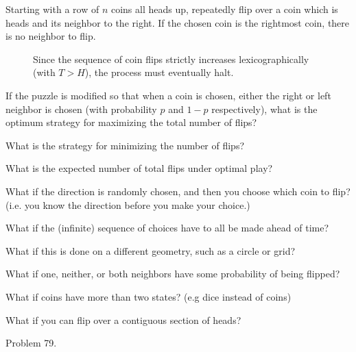 \documentclass{article}
\begin{document}
Starting with a row of $n$ coins all heads up, repeatedly flip over a coin which
is heads and its neighbor to the right. If the chosen coin is the rightmost
coin, there is no neighbor to flip.

\begin{figure}[ht!]
  \centering
  \caption{
    Since the sequence of coin flips strictly increases lexicographically
    (with $T > H$), the process must eventually halt.
  }
\end{figure}
\begin{question}
  If the puzzle is modified so that when a coin is chosen, either the right or
  left neighbor is chosen (with probability $p$ and $1 - p$ respectively),
  what is the optimum strategy for maximizing the total number of flips?
\end{question}

\begin{related}
  \item What is the strategy for minimizing the number of flips?
  \item What is the expected number of total flips under optimal play?
  \item What if the direction is randomly chosen, and then you choose which
  coin to flip? (i.e. you know the direction before you make your choice.)
  \item What if the (infinite) sequence of choices have to all be made ahead of
  time?
  \item What if this is done on a different geometry, such as a circle or grid?
  \item What if one, neither, or both neighbors have some probability of being
    flipped?
  \item What if coins have more than two states? (e.g dice instead of coins)
  \item What if you can flip over a contiguous section of heads?
\end{related}

\begin{references}
  \item Problem 79.
\end{references}
\end{document}
